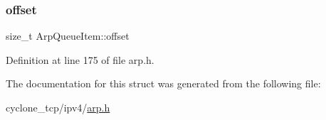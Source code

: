 \subsubsection{\texorpdfstring{offset}{offset}}
{\footnotesize\ttfamily size\+\_\+t Arp\+Queue\+Item\+::offset}



Definition at line 175 of file arp.\+h.



The documentation for this struct was generated from the following file\+:\begin{DoxyCompactItemize}
\item 
cyclone\+\_\+tcp/ipv4/\hyperlink{arp_8h}{arp.\+h}\end{DoxyCompactItemize}
